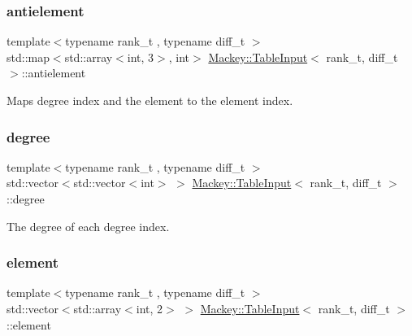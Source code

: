 \subsubsection{\texorpdfstring{antielement}{antielement}}
{\footnotesize\ttfamily template$<$typename rank\+\_\+t , typename diff\+\_\+t $>$ \\
std\+::map$<$std\+::array$<$int, 3$>$, int$>$ \hyperlink{classMackey_1_1TableInput}{Mackey\+::\+Table\+Input}$<$ rank\+\_\+t, diff\+\_\+t $>$\+::antielement\hspace{0.3cm}{\ttfamily [protected]}}



Maps degree index and the element to the element index. 

\mbox{\label{classMackey_1_1TableInput_a71c70914bfbaf0bbdd2d9f78a33d7a37}} 
\subsubsection{\texorpdfstring{degree}{degree}}
{\footnotesize\ttfamily template$<$typename rank\+\_\+t , typename diff\+\_\+t $>$ \\
std\+::vector$<$std\+::vector$<$int$>$ $>$ \hyperlink{classMackey_1_1TableInput}{Mackey\+::\+Table\+Input}$<$ rank\+\_\+t, diff\+\_\+t $>$\+::degree\hspace{0.3cm}{\ttfamily [protected]}}



The degree of each degree index. 

\mbox{\label{classMackey_1_1TableInput_a17b8785e7e6edb9b20f8a4f5b2421db7}} 
\subsubsection{\texorpdfstring{element}{element}}
{\footnotesize\ttfamily template$<$typename rank\+\_\+t , typename diff\+\_\+t $>$ \\
std\+::vector$<$std\+::array$<$int, 2$>$ $>$ \hyperlink{classMackey_1_1TableInput}{Mackey\+::\+Table\+Input}$<$ rank\+\_\+t, diff\+\_\+t $>$\+::element\hspace{0.3cm}{\ttfamily [protected]}}




